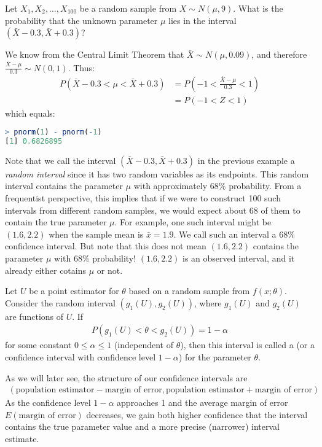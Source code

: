\begin{exmp}
    Let \( X_1, X_2, \ldots, X_100 \) be a random sample from \( X \sim N(\mu, 9) \).
    What is the probability that the unknown parameter \( \mu \) lies in the interval \( (\bar{X} - 0.3, \bar{X} + 0.3) \)?
\end{exmp}
\begin{solution}
    We know from the Central Limit Theorem that \( \bar{X} \sim N(\mu, 0.09) \),
    and therefore \( \frac{\bar{X} - \mu}{0.3} \sim N(0, 1) \). Thus:
    \begin{align*}
        P(\bar{X} - 0.3 < \mu < \bar{X} + 0.3) &= P(-1 < \frac{\bar{X} - \mu}{0.3} < 1)\\
        &= P(-1 < Z < 1)
    \end{align*}
    which equals:
    \begin{lstlisting}[language=R]
> pnorm(1) - pnorm(-1)
[1] 0.6826895
    \end{lstlisting}
\end{solution}
Note that we call the interval \( (\bar{X} - 0.3, \bar{X} + 0.3) \) in the previous example a \emph{random interval} since it has two random variables as its endpoints.
This random interval contains the parameter \( \mu \) with approximately 68\% probability.
From a frequentist perspective, this implies that if we were to construct 100 such intervals from different random samples, we would expect about 68 of them to contain the true parameter \( \mu \).
For example, one such interval might be \( (1.6, 2.2) \) when the sample mean is \( \bar{x} = 1.9 \).
We call such an interval a 68\% confidence interval.
But note that this does not mean \( (1.6, 2.2) \) contains the parameter \( \mu \) with 68\% probability!
\( (1.6, 2.2) \) is an observed interval, and it already either cotains \( \mu \) or not.

Let \( U \) be a point estimator for \( \theta \) based on a random sample from \( f(x; \theta) \).
Consider the random interval \( (g_1(U), g_2(U)) \), where \( g_1(U) \) and \( g_2(U) \) are functions of \( U \).
If
\begin{gather*}
    P(g_1(U) < \theta < g_2(U)) = 1 - \alpha
\end{gather*}
for some constant \( 0 \leq \alpha \leq 1 \) (independent of \( \theta \)),
then this interval is called a  (or a confidence interval with confidence level \( 1 - \alpha \)) for the parameter \( \theta \).

As we will later see, the structure of our confidence intervals are
\begin{gather*}
    (\text{population estimator} - \text{margin of error}, \text{population estimator} + \text{margin of error})
\end{gather*}
As the confidence level \( 1 - \alpha \) approaches 1 and the average margin of error \( E(\text{margin of error}) \) decreases,
we gain both higher confidence that the interval contains the true parameter value and a more precise (narrower) interval estimate.

